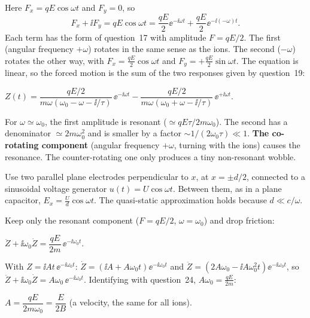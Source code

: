 \documentclass[11pt,a4paper]{article}
\begin{document}
Here $F_x = qE\cos\omega t$ and $F_y = 0$, so
\[
  F_x + \ii F_y = qE\cos\omega t = \frac{qE}{2}\ee^{-\ii\omega t} + \frac{qE}{2}\ee^{-\ii(-\omega)t}.
\]
Each term has the form of question~17 with amplitude $F = qE/2$. The first (angular frequency
$+\omega$) rotates in the same sense as the ions. The second ($-\omega$) rotates the other way,
with $F_x = \frac{qE}2\cos\omega t$ and $F_y = +\frac{qE}2\sin\omega t$. The equation is linear,
so the forced motion is the sum of the two responses given by question~19:
\begin{result}
$Z(t) = \dfrac{qE/2}{m\omega(\omega_0 - \omega - \ii/\tau)}\,\ee^{-\ii\omega t}
      - \dfrac{qE/2}{m\omega(\omega_0 + \omega - \ii/\tau)}\,\ee^{+\ii\omega t}.$
\end{result}
For $\omega\simeq\omega_0$, the first amplitude is resonant ($\simeq qE\tau/2m\omega_0$). The
second has a denominator $\simeq2m\omega_0^2$ and is smaller by a factor
$\sim1/(2\omega_0\tau)\ll1$. \textbf{The co-rotating component} (angular frequency $+\omega$,
turning with the ions) causes the resonance. The counter-rotating one only produces a tiny
non-resonant wobble.

Use two parallel plane electrodes perpendicular to $x$, at $x = \pm d/2$, connected to a
sinusoidal voltage generator $u(t) = U\cos\omega t$. Between them, as in a plane capacitor,
$E_x = \frac Ud\cos\omega t$. The quasi-static approximation holds because $d\ll c/\omega$.

Keep only the resonant component ($F = qE/2$, $\omega = \omega_0$) and drop friction:
\begin{result}
$\ddot Z + \ii\omega_0\dot Z = \dfrac{qE}{2m}\,\ee^{-\ii\omega_0t}.$
\end{result}

With $Z = \ii At\,\ee^{-\ii\omega_0t}$: $\dot Z = (\ii A + A\omega_0t)\ee^{-\ii\omega_0t}$ and
$\ddot Z = (2A\omega_0 - \ii A\omega_0^2t)\ee^{-\ii\omega_0t}$, so
$\ddot Z + \ii\omega_0\dot Z = A\omega_0\,\ee^{-\ii\omega_0t}$. Identifying with question~24,
$A\omega_0 = \frac{qE}{2m}$:
\begin{result}
$A = \dfrac{qE}{2m\omega_0} = \dfrac{E}{2B}$ \quad (a velocity, the same for all ions).
\end{result}
\end{document}
